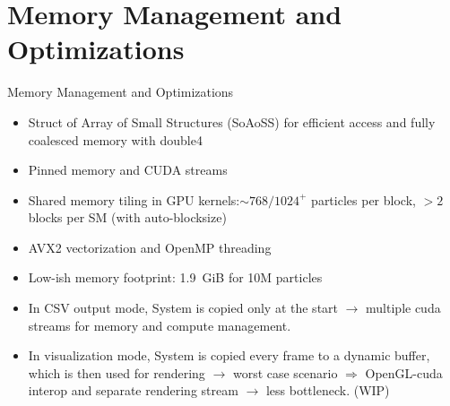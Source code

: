 \documentclass{beamer}
\begin{document}
\section{Memory Management and Optimizations}
\begin{frame}{Memory Management and Optimizations}
    \begin{itemize}
        \item Struct of Array of Small Structures (SoAoSS) for efficient access and fully coalesced memory with double4
        \item Pinned memory and CUDA streams
        \item Shared memory tiling in GPU kernels:$\sim 768/1024^+$ particles per block, $>2$ blocks per SM (with auto-blocksize)
        \item AVX2 vectorization and OpenMP threading
        \item Low-ish memory footprint: \SI{1.9}{GiB} for 10M particles
        \item In CSV output mode, System is copied only at the start $\rightarrow$ multiple cuda streams for memory and compute management.
        \item In visualization mode, System is copied every frame to a dynamic buffer, which is then used for rendering
                $\rightarrow$ worst case scenario $\Rightarrow$ OpenGL-cuda interop and separate rendering stream $\rightarrow$ less bottleneck. (WIP)
    \end{itemize}
\end{frame}
\end{document}
